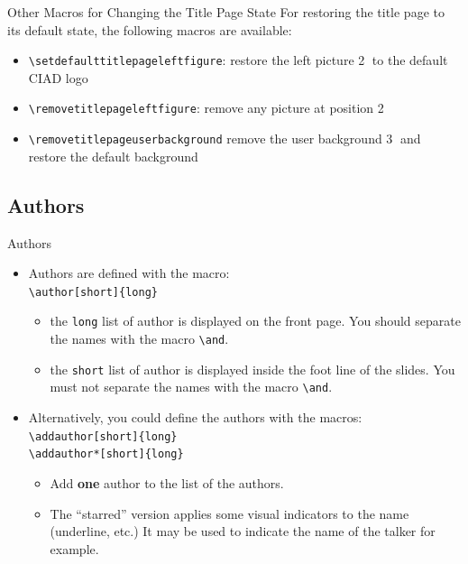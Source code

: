 \documentclass[english,sectioncirclenumberstyle]{ciadbeamer}
\begin{document}
\begin{frame}{{Other Macros} for Changing the Title Page State}
	For restoring the title page to its default state, the following macros are available: \\[.25cm]
	\begin{itemize}
		\item \texttt{{\textbackslash}setdefaulttitlepageleftfigure}: restore the left picture \textcircled{2} to the default CIAD logo
		\item \texttt{{\textbackslash}removetitlepageleftfigure}: remove any picture at position \textcircled{2}
		\item \texttt{{\textbackslash}removetitlepageuserbackground} remove the user background \textcircled{3} and restore the default background
	\end{itemize}
\end{frame}

\subsection{Authors}

\begin{frame}{Authors}
	\begin{itemize}
	\item Authors are defined with the macro: \\
		\texttt{{\textbackslash}author[short]\{long\}}
		\begin{itemize}
		\item the \texttt{long} list of author is displayed on the front page. You should separate the names with the macro \texttt{{\textbackslash}and}.
		\item the \texttt{short} list of author is displayed inside the foot line of the slides. You \alert{must not separate} the names with the macro \texttt{{\textbackslash}and}.
		\end{itemize}
	\vfill
	\item \alert{Alternatively}, you could define the authors with the macros: \\
		\texttt{{\textbackslash}addauthor[short]\{long\}} \\
		\texttt{{\textbackslash}addauthor*[short]\{long\}}
		\begin{itemize}
		\item Add \textbf{one} author to the list of the authors.
		\item The ``starred'' version applies some visual indicators to the name (underline, etc.) It may be used to indicate the name of the talker for example.
		\end{itemize}
	\end{itemize}
	\vfill
\end{frame}
\end{document}

